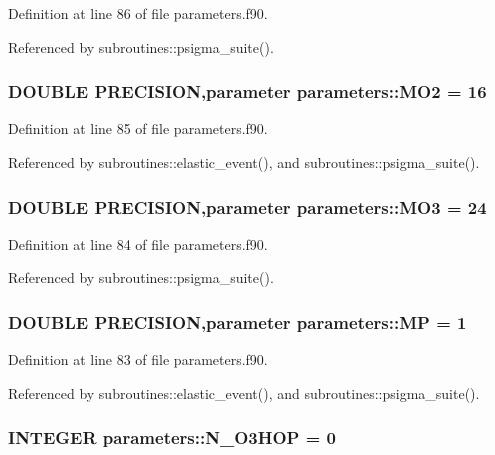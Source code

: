 Definition at line 86 of file parameters.f90.

Referenced by subroutines::psigma\_\-suite().\hypertarget{namespaceparameters_a8f3ca9bcf2af3dccca1f89e678dd9149}{
\subsubsection[{MO2}]{\setlength{\rightskip}{0pt plus 5cm}DOUBLE PRECISION,parameter {\bf parameters::MO2} = 16}}
\label{namespaceparameters_a8f3ca9bcf2af3dccca1f89e678dd9149}


Definition at line 85 of file parameters.f90.

Referenced by subroutines::elastic\_\-event(), and subroutines::psigma\_\-suite().\hypertarget{namespaceparameters_a9fe3ba34735e9bd271a5dfa94242d60f}{
\subsubsection[{MO3}]{\setlength{\rightskip}{0pt plus 5cm}DOUBLE PRECISION,parameter {\bf parameters::MO3} = 24}}
\label{namespaceparameters_a9fe3ba34735e9bd271a5dfa94242d60f}


Definition at line 84 of file parameters.f90.

Referenced by subroutines::psigma\_\-suite().\hypertarget{namespaceparameters_a55c34135e7a3b750b692c7fe5c44d996}{
\subsubsection[{MP}]{\setlength{\rightskip}{0pt plus 5cm}DOUBLE PRECISION,parameter {\bf parameters::MP} = 1}}
\label{namespaceparameters_a55c34135e7a3b750b692c7fe5c44d996}


Definition at line 83 of file parameters.f90.

Referenced by subroutines::elastic\_\-event(), and subroutines::psigma\_\-suite().\hypertarget{namespaceparameters_aa23f74ffe716d5e4093a0f9e951ff501}{
\subsubsection[{N\_\-O3HOP}]{\setlength{\rightskip}{0pt plus 5cm}INTEGER {\bf parameters::N\_\-O3HOP} = 0}}
\label{namespaceparameters_aa23f74ffe716d5e4093a0f9e951ff501}


